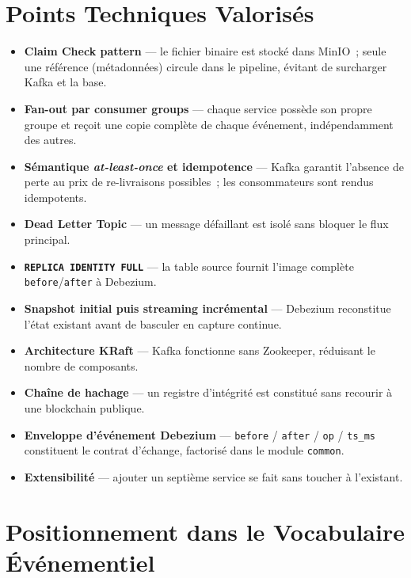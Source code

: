 \documentclass[12pt,a4paper,openany]{report}
\begin{document}
    \section{Points Techniques Valoris\'es}

    \begin{itemize}[noitemsep]
      \item \textbf{Claim Check pattern} --- le fichier binaire est stock\'e dans MinIO~; seule une r\'ef\'erence (m\'etadonn\'ees) circule dans le pipeline, \'evitant de surcharger Kafka et la base.
      \item \textbf{Fan-out par consumer groups} --- chaque service poss\`ede son propre groupe et re\c{c}oit une copie compl\`ete de chaque \'ev\'enement, ind\'ependamment des autres.
      \item \textbf{S\'emantique \emph{at-least-once} et idempotence} --- Kafka garantit l'absence de perte au prix de re-livraisons possibles~; les consommateurs sont rendus idempotents.
      \item \textbf{Dead Letter Topic} --- un message d\'efaillant est isol\'e sans bloquer le flux principal.
      \item \textbf{\texttt{REPLICA IDENTITY FULL}} --- la table source fournit l'image compl\`ete \texttt{before}/\texttt{after} \`a Debezium.
      \item \textbf{Snapshot initial puis streaming incr\'emental} --- Debezium reconstitue l'\'etat existant avant de basculer en capture continue.
      \item \textbf{Architecture KRaft} --- Kafka fonctionne sans Zookeeper, r\'eduisant le nombre de composants.
      \item \textbf{Cha\^ine de hachage} --- un registre d'int\'egrit\'e est constitu\'e sans recourir \`a une blockchain publique.
      \item \textbf{Enveloppe d'\'ev\'enement Debezium} --- \texttt{before} / \texttt{after} / \texttt{op} / \texttt{ts\_ms} constituent le contrat d'\'echange, factoris\'e dans le module \texttt{common}.
      \item \textbf{Extensibilit\'e} --- ajouter un septi\`eme service se fait sans toucher \`a l'existant.
    \end{itemize}

    \section{Positionnement dans le Vocabulaire \'Ev\'enementiel}
    \label{sec:positionnement}
\end{document}

